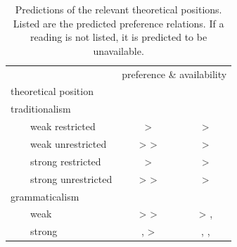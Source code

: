 \documentclass[fleqn,reqno,10pt,draft]{article}
\newcommand{\lit}{\acro{lit}}
\newcommand{\glb}{\acro{glb}}
\newcommand{\loc}{\acro{loc}}
\newcommand{\as}{\acro{as}}
\renewcommand{\es}{\acro{es}}
\begin{document}
\begin{table}[t]
  \centering
  \begin{tabular}{lcc}
    & \multicolumn{2}{c}{preference \& availability}
    \\ \cmidrule(r){2-3}
    theoretical position
    & \as
    & \es
    \\ \midrule
    traditionalism
    \\
    \ \ \ \ weak restricted 
    & \lit > \glb 
    & \lit > \glb
    \\
    \ \ \ \ weak unrestricted
    & \lit > \glb > \loc 
    & \lit > \glb
    \\
    \ \ \ \ strong restricted
    & \glb > \lit 
    & \glb > \lit
    \\
    \ \ \ \ strong unrestricted
    & \glb > \loc > \lit 
    & \glb > \lit
    \\
    grammaticalism
    \\
    \ \ \ \ weak
    & \loc > \glb > \lit 
    & \glb > \lit, \loc
    \\
    \ \ \ \ strong
    & \glb, \loc > \lit 
    & \glb, \loc , \lit
    \\
  \end{tabular}
  \caption{Predictions of the relevant theoretical positions. Listed
    are the predicted preference relations. If a reading is not
    listed, it is predicted to be unavailable.}
  \label{tab:predictions}
\end{table}
\end{document}
